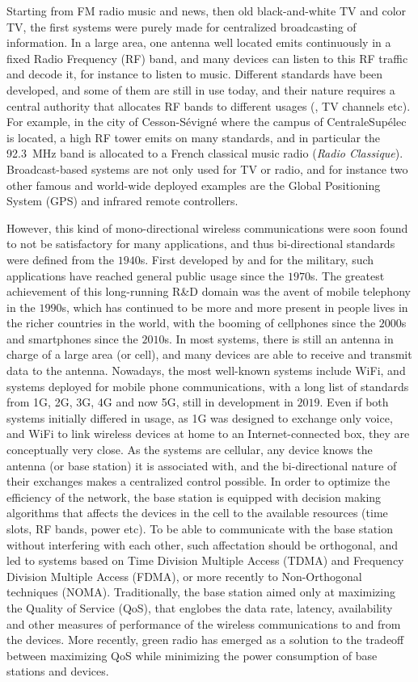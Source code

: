 Starting from FM radio music and news, then old black-and-white TV and color TV, the first systems were purely made for centralized broadcasting of information. In a large area, one antenna well located emits continuously in a fixed Radio Frequency (RF) band, and many devices can listen to this RF traffic and decode it, for instance to listen to music.
Different standards have been developed, and some of them are still in use today, and their nature requires a central authority that allocates RF bands to different usages (\eg, TV channels etc).
For example, in the city of Cesson-Sévigné where the campus of CentraleSupélec is located, a high RF tower emits on many standards, and in particular the \SI{92.3}{\mega\hertz} band is allocated to a French classical music radio (\emph{Radio Classique}).
Broadcast-based systems are not only used for TV or radio,
and for instance two other famous and world-wide deployed examples are the Global Positioning System (GPS) and infrared remote controllers.

However, this kind of mono-directional wireless communications were soon found to not be satisfactory for many applications, and thus bi-directional standards were defined from the $1940$s.
First developed by and for the military, such applications have reached general public usage since the $1970$s.
The greatest achievement of this long-running R\&D domain was the avent of mobile telephony in the $1990$s, which has continued to be more and more present in people lives in the richer countries in the world, with the booming of cellphones since the $2000$s and smartphones since the $2010$s.
In most systems, there is still an antenna in charge of a large area (or cell), and many devices are able to receive and transmit data to the antenna.
Nowadays, the most well-known systems include WiFi, and systems deployed for mobile phone communications, with a long list of standards from 1G, 2G, 3G, 4G and now 5G, still in development in $2019$.
Even if both systems initially differed in usage, as 1G was designed to exchange only voice, and WiFi to link wireless devices at home to an Internet-connected box, they are conceptually very close.
As the systems are cellular, any device knows the antenna (or base station) it is associated with, and the bi-directional nature of their exchanges makes a centralized control possible.
In order to optimize the efficiency of the network, the base station is equipped with decision making algorithms that affects the devices in the cell to the available resources (time slots, RF bands, power etc).
To be able to communicate with the base station without interfering with each other, such affectation should be orthogonal, and led to systems based on Time Division Multiple Access (TDMA) and Frequency Division Multiple Access (FDMA), or more recently to Non-Orthogonal techniques (NOMA).
Traditionally, the base station aimed only at maximizing the Quality of Service (QoS), that englobes the data rate, latency, availability and other measures of performance of the wireless communications to and from the devices.
More recently, green radio has emerged as a solution to the tradeoff between maximizing QoS while minimizing the power consumption of base stations and devices.

